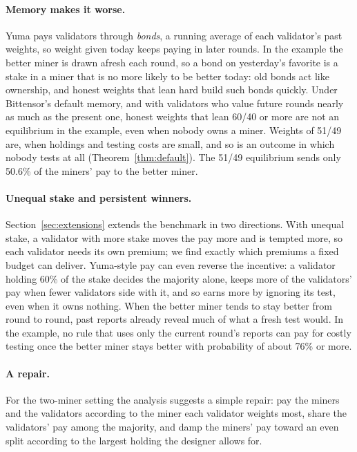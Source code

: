 \documentclass[sigconf,anonymous,review]{acmart}
\numberwithin{equation}{section}
\begin{document}
\paragraph{Memory makes it worse.} Yuma pays validators through \emph{bonds}, a
running average of each validator's past weights, so weight given today keeps
paying in later rounds. In the example the better miner is drawn afresh each
round, so a bond on yesterday's favorite is a stake in a miner that is no more
likely to be better today: old bonds act like ownership, and honest weights
that lean hard build such bonds quickly. Under Bittensor's default memory, and
with validators who value future rounds nearly as much as the present one,
honest weights that lean 60/40 or more are not an equilibrium in the example,
even when nobody owns a miner. Weights of 51/49 are, when holdings and testing
costs are small, and so is an outcome in which nobody tests at all
(Theorem~\ref{thm:default}). The 51/49 equilibrium sends only 50.6\% of the
miners' pay to the better miner.

\paragraph{Unequal stake and persistent winners.}
Section~\ref{sec:extensions} extends the benchmark in two directions. With
unequal stake, a validator with more stake moves the pay more and is tempted
more, so each validator needs its own premium; we find exactly which premiums
a fixed budget can deliver. Yuma-style pay can even reverse the incentive: a
validator holding 60\% of the stake decides the majority alone, keeps more of
the validators' pay when fewer validators side with it, and so earns more by
ignoring its test, even when it owns nothing. When the better miner tends to
stay better from round to round, past reports already reveal much of what a
fresh test would. In the example, no rule that uses only the current round's
reports can pay for costly testing once the better miner stays better with
probability of about 76\% or more.

\paragraph{A repair.} For the two-miner setting the analysis suggests a simple
repair: pay the miners and the validators according to the miner each
validator weights most, share the validators' pay among the majority, and damp
the miners' pay toward an even split according to the largest holding the
designer allows for.
\end{document}
